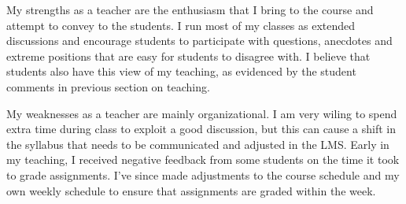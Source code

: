 \documentclass[12pt,letterpaper]{report}
\begin{document}
My strengths as a teacher are the enthusiasm that I bring to the course and attempt to convey to the students.  I run most of my classes as extended discussions and encourage students to participate with questions, anecdotes and extreme positions that are easy for students to disagree with.    I believe that students also have this view of my teaching, as evidenced by the student comments in previous section on teaching.

My weaknesses as a teacher are mainly organizational.  I am very wiling to spend extra time during class to exploit a good discussion, but this can cause a shift in the syllabus that needs to be communicated and adjusted in the LMS.  Early in my teaching, I received negative feedback from some students on the time it took to grade assignments.  I've since made adjustments to the course schedule and my own weekly schedule to ensure that assignments are graded within the week. 

%


\end{document}
